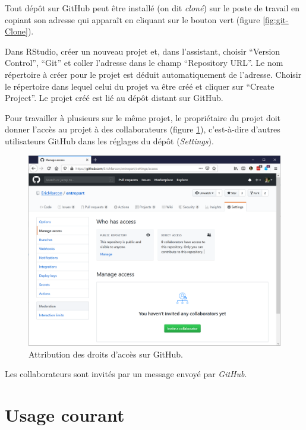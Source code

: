 \documentclass[
  12pt,
  french,
  a4paper,
  extrafontsizes,onecolumn,openright
  ]{memoir}
\begin{document}
\normalsize

Tout dépôt sur GitHub peut être installé (on dit \emph{cloné}) sur le poste de travail en copiant son adresse qui apparaît en cliquant sur le bouton vert (figure \ref{fig:git-Clone}).

Dans RStudio, créer un nouveau projet et, dans l'assistant, choisir \enquote{Version Control}, \enquote{Git} et coller l'adresse dans le champ \enquote{Repository URL}.
Le nom répertoire à créer pour le projet est déduit automatiquement de l'adresse.
Choisir le répertoire dans lequel celui du projet va être créé et cliquer sur \enquote{Create Project}.
Le projet créé est lié au dépôt distant sur GitHub.

Pour travailler à plusieurs sur le même projet, le propriétaire du projet doit donner l'accès au projet à des collaborateurs (figure \ref{fig:git-Access}), c'est-à-dire d'autres utilisateurs GitHub dans les réglages du dépôt (\emph{Settings}).



\scriptsize

\begin{figure}

{\centering \includegraphics[width=0.8\linewidth]{images/git-Access} 

}

\caption{Attribution des droits d'accès sur GitHub.}\label{fig:git-Access}
\end{figure}

\normalsize

Les collaborateurs sont invités par un message envoyé par \emph{GitHub}.

\hypertarget{usage-courant}{%
\section{Usage courant}\label{usage-courant}}
\end{document}

